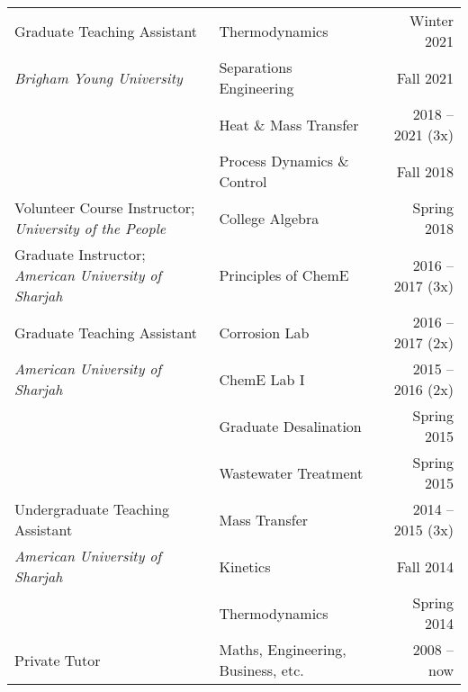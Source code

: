 \documentclass[letterpaper,11pt]{article}
\begin{document}
\begin{longtable}{@{}p{}p{}r@{}}
     Graduate Teaching Assistant                                    & Thermodynamics                                      & Winter 2021       \\
     \textit{Brigham Young University}                              & Separations Engineering                             & Fall 2021         \\
                                                                    & Heat \& Mass Transfer                               & 2018 -- 2021 (3x) \\
                                                                    & Process Dynamics \& Control                         & Fall 2018         \\[4pt]
     Volunteer Course Instructor; \textit{University of the People} & College Algebra                                     & Spring 2018       \\[4pt]
     Graduate Instructor; \textit{American University of Sharjah}   & Principles of ChemE                                 & 2016 -- 2017 (3x) \\[4pt]
     Graduate Teaching Assistant                                    & Corrosion Lab                                       & 2016 -- 2017 (2x) \\
     \textit{American University of Sharjah}                        & ChemE Lab I                                         & 2015 -- 2016 (2x) \\
                                                                    & Graduate Desalination                               & Spring 2015       \\
                                                                    & Wastewater Treatment                                & Spring 2015       \\[4pt]
     Undergraduate Teaching Assistant                               & Mass Transfer                                       & 2014 -- 2015 (3x) \\
     \textit{American University of Sharjah}                        & Kinetics                                            & Fall 2014         \\
                                                                    & Thermodynamics                                      & Spring 2014       \\[4pt]
     Private Tutor                                                  & Maths, Engineering, Business, etc.                  & 2008 -- now
\end{longtable}
\end{document}
